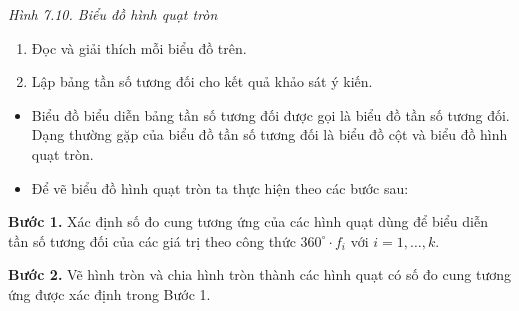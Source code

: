 \begin{lesson}
    \begin{center}

    \textit{Hình 7.10. Biểu đồ hình quạt tròn}
    \end{center}

    \begin{enumerate}[label=\alph*)]
        \item Đọc và giải thích mỗi biểu đồ trên.

        \answerline
        \answerline

        \item Lập bảng tần số tương đối cho kết quả khảo sát ý kiến.

        \answerline
    \end{enumerate}

    \begin{keyconcept}
        \begin{itemize}
            \item Biểu đồ biểu diễn bảng tần số tương đối được gọi là biểu đồ tần số tương đối. Dạng thường gặp của biểu đồ tần số tương đối là biểu đồ cột và biểu đồ hình quạt tròn.
            \item Để vẽ biểu đồ hình quạt tròn ta thực hiện theo các bước sau:
        \end{itemize}

        \textbf{Bước 1.} Xác định số đo cung tương ứng của các hình quạt dùng để biểu diễn tần số tương đối của các giá trị theo công thức $360^\circ\cdot f_i$ với $i=1,\ldots,k$.

        \textbf{Bước 2.} Vẽ hình tròn và chia hình tròn thành các hình quạt có số đo cung tương ứng được xác định trong Bước 1.


\end{keyconcept}
\end{lesson}
